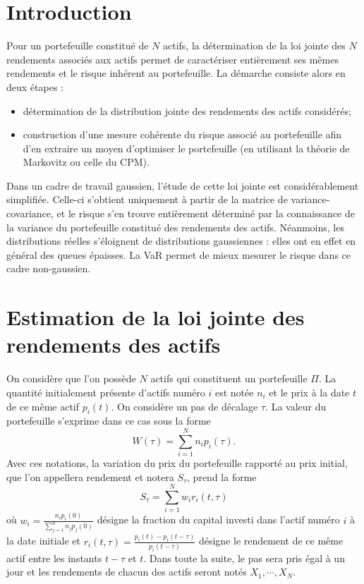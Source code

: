 \documentclass{article}
\begin{document}
\newpage 

\tableofcontents

\newpage

\section{Introduction}

Pour un portefeuille constitué de $N$ actifs, la détermination de la loi jointe des $N$ rendements  associés aux actifs permet de caractériser entièrement ses mêmes rendements et le risque inhérent au portefeuille. La démarche consiste alors en deux étapes :
\begin{itemize}
\item détermination de la distribution jointe des rendements des actifs considérés;
\item construction d'une mesure cohérente du risque associé au portefeuille afin d'en extraire un moyen d'optimiser le portefeuille (en utilisant la théorie de Markovitz ou celle du CPM).
\end{itemize}
Dans un cadre de travail gaussien, l'étude de cette loi jointe est considérablement simplifiée. Celle-ci s'obtient uniquement à partir de la matrice de variance-covariance, et le risque s'en trouve entièrement déterminé par la connaissance de la variance du portefeuille constitué des rendements des actifs. Néanmoins, les distributions réelles s'éloignent de distributions gaussiennes : elles ont en effet en général des queues épaisses. La VaR permet de mieux mesurer le risque dans ce cadre non-gaussien.

\section{Estimation de la loi jointe des rendements des actifs}

On considère que l'on possède $N$ actifs qui constituent un portefeuille $\Pi$. La quantité initialement présente d'actifs numéro $i$ est notée $n_{i}$ et le prix à la date $t$ de ce même actif $p_{i}(t)$.  On considère un pas de décalage $\tau$. La valeur du portefeuille s'exprime dans ce cas sous la forme
\begin{equation}
W (\tau )=\sum_{i= 1}^{N}n_{i}p_{i} (\tau ).
\end{equation}
Avec ces notations, la variation du prix du portefeuille rapporté au prix initial, que l'on appellera rendement et notera $ S_{\tau} $, prend la forme
\begin{equation}
S_{\tau}=\sum_{i= 1}^{N}w_{i}r_{i} (t,\tau )
\end{equation}
où $ w_{i}=\frac{n_{i}p_{i}(0)}{\sum_{j=1}^{n}n_{j}p_{j}(0)} $ désigne la fraction du capital investi dans l'actif numéro $ i $ à la date initiale et $ r_{i}(t,\tau )=\frac{p_{i}(t)-p_{i}(t-\tau )}{p_{i}(t-\tau )} $ désigne le rendement de ce même actif entre les instants $t-\tau$ et $t$.
Dans toute la suite, le pas sera pris égal à un jour et les rendements de chacun des actifs seront notés $ X_{ 1},\cdots , X_{N} $.
\end{document}
